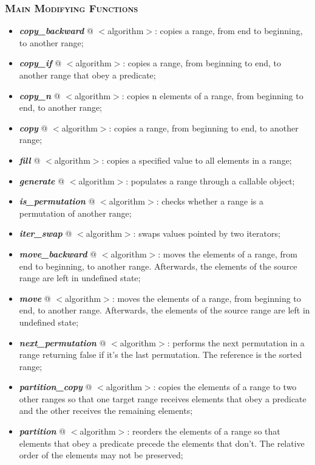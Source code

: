 \documentclass[10pt]{article}
\begin{document}
\begin{multicols*}{4}
{\subsubsection*{\textsc{Main Modifying Functions}} 
\begin{itemize}[leftmargin=*,topsep=0.25pt]
  \setlength\itemsep{-1.8pt}
	\item  \emph{\textbf{copy\_backward}} @ $<$algorithm$>$: copies a range, from end to beginning, to another range;
	\item  \emph{\textbf{copy\_if}} @ $<$algorithm$>$: copies a range, from beginning to end, to another range that obey a predicate;
	\item  \emph{\textbf{copy\_n}} @ $<$algorithm$>$: copies n elements of a range, from beginning to end, to another range;
	\item  \emph{\textbf{copy}} @ $<$algorithm$>$: copies a range, from beginning to end, to another range;
	\item  \emph{\textbf{fill}} @ $<$algorithm$>$: copies a specified value to all elements in a range;
	\item  \emph{\textbf{generate}} @ $<$algorithm$>$: populates a range through a callable object;
	\item  \emph{\textbf{is\_permutation}} @ $<$algorithm$>$: checks whether a range is a permutation of another range;
	\item  \emph{\textbf{iter\_swap}} @ $<$algorithm$>$: swaps values pointed by two iterators;
	\item  \emph{\textbf{move\_backward}} @ $<$algorithm$>$: moves the elements of a range, from end to beginning, to another range. Afterwards, the elements of the source range are left in undefined state;
	\item  \emph{\textbf{move}} @ $<$algorithm$>$: moves the elements of a range, from beginning to end, to another range. Afterwards, the elements of the source range are left in undefined state;
	\item  \emph{\textbf{next\_permutation}} @ $<$algorithm$>$: performs the next permutation in a range returning false if it's the last permutation. The reference is the sorted range;
	\item  \emph{\textbf{partition\_copy}} @ $<$algorithm$>$: copies the elements of a range to two other ranges so that one target range receives elements that obey a predicate and the other receives the remaining elements;
	\item  \emph{\textbf{partition}} @ $<$algorithm$>$: reorders the elements of a range so that elements that obey a predicate precede the elements that don't. The relative order of the elements may not be preserved;

\end{itemize}}
\end{multicols*}
\end{document}
